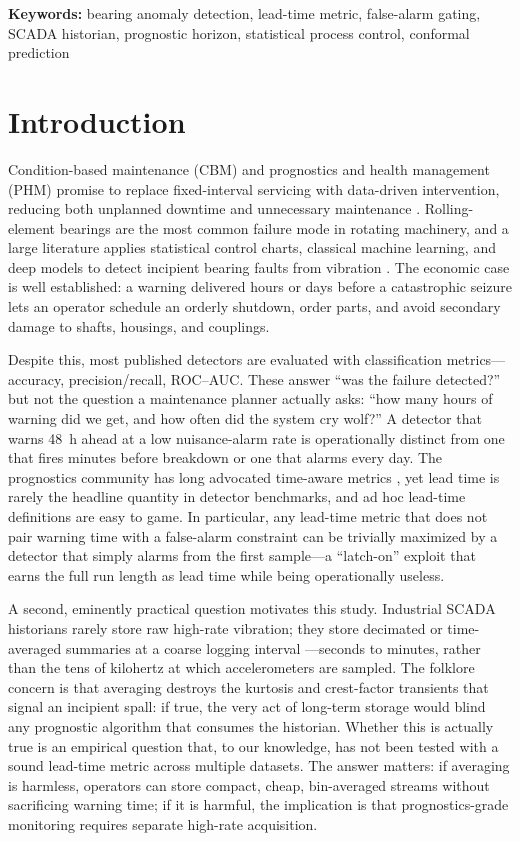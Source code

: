 \documentclass[IJPHM, 2026, 0]{PHMSociety}
\begin{document}
\medskip
\noindent\textbf{Keywords:} bearing anomaly detection, lead-time metric, false-alarm gating, SCADA historian, prognostic horizon, statistical process control, conformal prediction
\medskip


\section{Introduction}
\label{sec:intro}
Condition-based maintenance (CBM) and prognostics and health management (PHM) promise to replace fixed-interval servicing with data-driven intervention, reducing both unplanned downtime and unnecessary maintenance \cite{jardine2006review,lee2014prognostics,lei2018machinery}. Rolling-element bearings are the most common failure mode in rotating machinery, and a large literature applies statistical control charts, classical machine learning, and deep models to detect incipient bearing faults from vibration \cite{randall2011rolling,zhao2019deep}. The economic case is well established: a warning delivered hours or days before a catastrophic seizure lets an operator schedule an orderly shutdown, order parts, and avoid secondary damage to shafts, housings, and couplings.

Despite this, most published detectors are evaluated with classification metrics---accuracy, precision/recall, ROC--AUC. These answer ``was the failure detected?'' but not the question a maintenance planner actually asks: ``how many hours of warning did we get, and how often did the system cry wolf?'' A detector that warns 48~h ahead at a low nuisance-alarm rate is operationally distinct from one that fires minutes before breakdown or one that alarms every day. The prognostics community has long advocated time-aware metrics \cite{saxena2008metrics,saxena2010metrics,goebel2011comparison}, yet lead time is rarely the headline quantity in detector benchmarks, and ad hoc lead-time definitions are easy to game. In particular, any lead-time metric that does not pair warning time with a false-alarm constraint can be trivially maximized by a detector that simply alarms from the first sample---a ``latch-on'' exploit that earns the full run length as lead time while being operationally useless.

A second, eminently practical question motivates this study. Industrial SCADA historians rarely store raw high-rate vibration; they store decimated or time-averaged summaries at a coarse logging interval \cite{tautzweinert2017using}---seconds to minutes, rather than the tens of kilohertz at which accelerometers are sampled. The folklore concern is that averaging destroys the kurtosis and crest-factor transients that signal an incipient spall: if true, the very act of long-term storage would blind any prognostic algorithm that consumes the historian. Whether this is actually true is an empirical question that, to our knowledge, has not been tested with a sound lead-time metric across multiple datasets. The answer matters: if averaging is harmless, operators can store compact, cheap, bin-averaged streams without sacrificing warning time; if it is harmful, the implication is that prognostics-grade monitoring requires separate high-rate acquisition.
\end{document}
